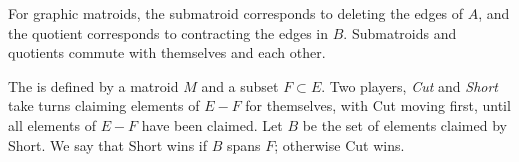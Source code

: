 \documentclass{article}
\begin{document}
For graphic matroids, the submatroid corresponds to deleting the edges of $A$, and the quotient corresponds to contracting the edges in $B$.  Submatroids and quotients commute with themselves and each other.

\begin{definition}
  The  is defined by a matroid $M$ and a subset $F \subset E$.
  Two players, \emph{Cut} and \emph{Short} take turns claiming elements of $E - F$ for themselves, with Cut moving first, until all elements of $E - F$ have been claimed.
  Let $B$ be the set of elements claimed by Short.
  We say that Short wins if $B$ spans $F$; otherwise Cut wins.
\end{definition}

\end{document}
